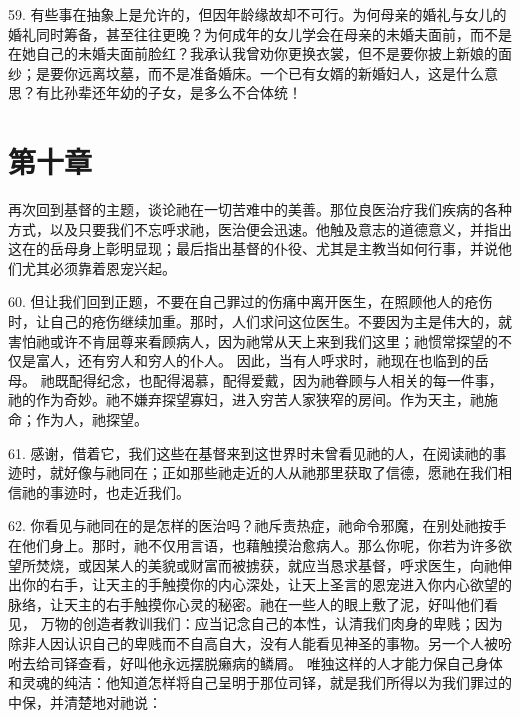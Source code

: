59. 有些事在抽象上是允许的，但因年龄缘故却不可行。为何母亲的婚礼与女儿的婚礼同时筹备，甚至往往更晚？为何成年的女儿学会在母亲的未婚夫面前，而不是在她自己的未婚夫面前脸红？我承认我曾劝你更换衣裳，但不是要你披上新娘的面纱；是要你远离坟墓，而不是准备婚床。一个已有女婿的新婚妇人，这是什么意思？有比孙辈还年幼的子女，是多么不合体统！\par


\section{第十章}

再次回到基督的主题，谈论祂在一切苦难中的美善。那位良医治疗我们疾病的各种方式，以及只要我们不忘呼求祂，医治便会迅速。他触及意志的道德意义，并指出这在的岳母身上彰明显现；最后指出基督的仆役、尤其是主教当如何行事，并说他们尤其必须靠着恩宠兴起。\par

60. 但让我们回到正题，不要在自己罪过的伤痛中离开医生，在照顾他人的疮伤时，让自己的疮伤继续加重。那时，人们求问这位医生。不要因为主是伟大的，就害怕祂或许不肯屈尊来看顾病人，因为祂常从天上来到我们这里；祂惯常探望的不仅是富人，还有穷人和穷人的仆人。 因此，当有人呼求时，祂现在也临到的岳母。 祂既配得纪念，也配得渴慕，配得爱戴，因为祂眷顾与人相关的每一件事，祂的作为奇妙。祂不嫌弃探望寡妇，进入穷苦人家狭窄的房间。作为天主，祂施命；作为人，祂探望。\par

61. 感谢，借着它，我们这些在基督来到这世界时未曾看见祂的人，在阅读祂的事迹时，就好像与祂同在；正如那些祂走近的人从祂那里获取了信德，愿祂在我们相信祂的事迹时，也走近我们。\par

62. 你看见与祂同在的是怎样的医治吗？祂斥责热症，祂命令邪魔，在别处祂按手在他们身上。那时，祂不仅用言语，也藉触摸治愈病人。那么你呢，你若为许多欲望所焚烧，或因某人的美貌或财富而被掳获，就应当恳求基督，呼求医生，向祂伸出你的右手，让天主的手触摸你的内心深处，让天上圣言的恩宠进入你内心欲望的脉络，让天主的右手触摸你心灵的秘密。祂在一些人的眼上敷了泥，好叫他们看见， 万物的创造者教训我们：应当记念自己的本性，认清我们肉身的卑贱；因为除非人因认识自己的卑贱而不自高自大，没有人能看见神圣的事物。另一个人被吩咐去给司铎查看，好叫他永远摆脱癞病的鳞屑。 唯独这样的人才能力保自己身体和灵魂的纯洁：他知道怎样将自己呈明于那位司铎，就是我们所得以为我们罪过的中保，并清楚地对祂说：\par

